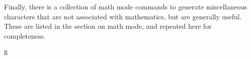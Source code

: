 Finally, there is a collection of math mode commands to generate
miscellaneous characters that are not associated with
mathematics, but are generally useful. These are listed in the
section on math mode, and repeated here for completeness.{\ss{}

\lft{$\$$, $\$$}	\ctr{$\#$, $\#$}	
		
		
}

